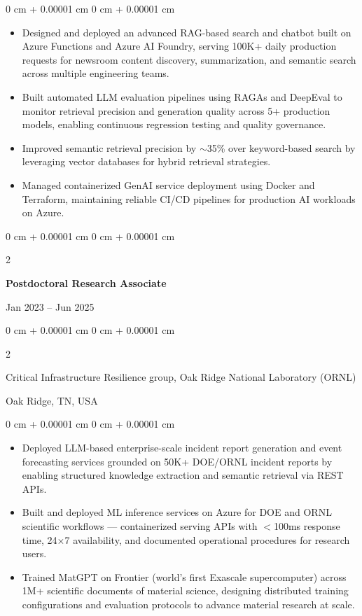 \documentclass[10pt, letterpaper]{article}
\newenvironment{highlights}{
    \begin{itemize}[
        topsep=0.10 cm,
        parsep=0.10 cm,
        partopsep=0pt,
        itemsep=0pt,
        leftmargin=0 cm + 10pt
    ]
}{
    \end{itemize}
} %
\newenvironment{onecolentry}{
    \begin{adjustwidth}{
        0 cm + 0.00001 cm
    }{
        0 cm + 0.00001 cm
    }
}{
    \end{adjustwidth}
} %
\newenvironment{twocolentry}[2][]{
    \onecolentry
    \def\secondColumn{#2}
    \setcolumnwidth{\fill, 4.5 cm}
    \begin{paracol}{2}
}{
    \switchcolumn \raggedleft \secondColumn
    \end{paracol}
    \endonecolentry
} %
\begin{document}
    \begin{onecolentry}
        \begin{highlights}
            \item Designed and deployed an advanced RAG-based search and chatbot built on Azure Functions and Azure AI Foundry, serving 100K+ daily production requests for newsroom content discovery, summarization, and semantic search across multiple engineering teams.
            \item Built automated LLM evaluation pipelines using RAGAs and DeepEval to monitor retrieval precision and generation quality across 5+ production models, enabling continuous regression testing and quality governance.
            \item Improved semantic retrieval precision by $\sim$35\% over keyword-based search by leveraging vector databases for hybrid retrieval strategies.
            \item Managed containerized GenAI service deployment using Docker and Terraform, maintaining reliable CI/CD pipelines for production AI workloads on Azure.
        \end{highlights}
    \end{onecolentry}

\vspace{1mm}

    \begin{twocolentry}{Jan 2023 -- Jun 2025}
        \textbf{Postdoctoral Research Associate}
    \end{twocolentry}
    \begin{twocolentry}{Oak Ridge, TN, USA}
        Critical Infrastructure Resilience group, Oak Ridge National Laboratory (ORNL)
    \end{twocolentry}
    \vspace{0.10 cm}
    \begin{onecolentry}
        \begin{highlights}
            \item Deployed LLM-based enterprise-scale incident report generation and event forecasting services grounded on 50K+ DOE/ORNL incident reports by enabling structured knowledge extraction and semantic retrieval via REST APIs.
            \item Built and deployed ML inference services on Azure for DOE and ORNL scientific workflows — containerized serving APIs with $<$100ms response time, 24$\times$7 availability, and documented operational procedures for research users.
            \item Trained MatGPT on Frontier (world’s first Exascale supercomputer) across 1M+ scientific documents of material science, designing distributed training configurations and evaluation protocols to advance material research at scale.
        \end{highlights}
    \end{onecolentry}
\end{document}

